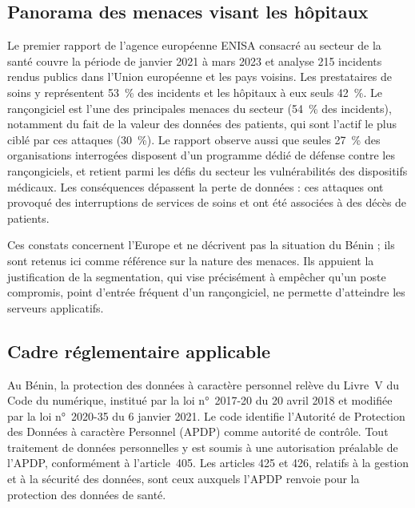 \subsection{Panorama des menaces visant les hôpitaux}

Le premier rapport de l'agence européenne ENISA consacré au secteur de la santé couvre la période de janvier 2021 à mars 2023 et analyse 215 incidents rendus publics dans l'Union européenne et les pays voisins\cite{enisa2023,enisa2023slides}. Les prestataires de soins y représentent 53~\% des incidents et les hôpitaux à eux seuls 42~\%\cite{enisa2023}. Le rançongiciel est l'une des principales menaces du secteur (54~\% des incidents), notamment du fait de la valeur des données des patients, qui sont l'actif le plus ciblé par ces attaques (30~\%)\cite{enisa2023press,infosec2023}. Le rapport observe aussi que seules 27~\% des organisations interrogées disposent d'un programme dédié de défense contre les rançongiciels\cite{heimdal2023}, et retient parmi les défis du secteur les vulnérabilités des dispositifs médicaux\cite{enisa2023slides}. Les conséquences dépassent la perte de données : ces attaques ont provoqué des interruptions de services de soins et ont été associées à des décès de patients\cite{infosec2023}.

Ces constats concernent l'Europe et ne décrivent pas la situation du Bénin ; ils sont retenus ici comme référence sur la nature des menaces. Ils appuient la justification de la segmentation, qui vise précisément à empêcher qu'un poste compromis, point d'entrée fréquent d'un rançongiciel, ne permette d'atteindre les serveurs applicatifs.

\subsection{Cadre réglementaire applicable}

Au Bénin, la protection des données à caractère personnel relève du Livre~V du Code du numérique, institué par la loi n°~2017-20 du 20 avril 2018 et modifiée par la loi n°~2020-35 du 6 janvier 2021\cite{codenum,asin}. Le code identifie l'Autorité de Protection des Données à caractère Personnel (APDP) comme autorité de contrôle\cite{codenum}. Tout traitement de données personnelles y est soumis à une autorisation préalable de l'APDP, conformément à l'article~405\cite{apdp405}. Les articles 425 et 426, relatifs à la gestion et à la sécurité des données, sont ceux auxquels l'APDP renvoie pour la protection des données de santé\cite{apdp2024}.

